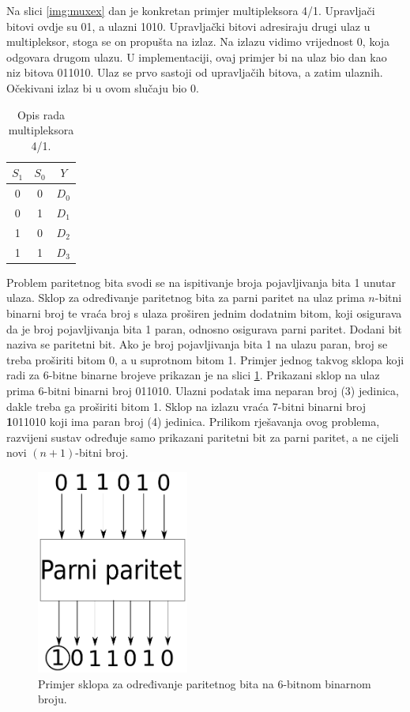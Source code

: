 \documentclass[times, utf8, zavrsni]{fer}
\begin{document}
Na slici \ref{img:muxex} dan je konkretan primjer multipleksora 4/1.
Upravljači bitovi ovdje su 01, a ulazni 1010.
Upravljački bitovi adresiraju drugi ulaz u multipleksor, stoga se on propušta na izlaz.
Na izlazu vidimo vrijednost 0, koja odgovara drugom ulazu.
U implementaciji, ovaj primjer bi na ulaz bio dan kao niz bitova 011010.
Ulaz se prvo sastoji od upravljačih bitova, a zatim ulaznih.
Očekivani izlaz bi u ovom slučaju bio 0.
\begin{table}[!htb]
    \caption{Opis rada multipleksora 4/1.}
    \label{tbl:mux}
    \centering
    \begin{tabular}{c | c | c}
        $S_{1}$ & $S_{0}$ & $Y$     \\ \hline
              0 &       0 & $D_{0}$ \\
              0 &       1 & $D_{1}$ \\
              1 &       0 & $D_{2}$ \\
              1 &       1 & $D_{3}$ \\
    \end{tabular}
\end{table}

Problem paritetnog bita svodi se na ispitivanje broja pojavljivanja bita 1 unutar ulaza.
Sklop za određivanje paritetnog bita za parni paritet na ulaz prima $n$-bitni binarni broj te vraća broj s ulaza proširen jednim dodatnim bitom, koji osigurava da je broj pojavljivanja bita 1 paran, odnosno osigurava parni paritet.
Dodani bit naziva se paritetni bit.
Ako je broj pojavljivanja bita 1 na ulazu paran, broj se treba proširiti bitom 0, a u suprotnom bitom 1.
Primjer jednog takvog sklopa koji radi za 6-bitne binarne brojeve prikazan je na slici \ref{img:parex}. Prikazani sklop na ulaz prima 6-bitni binarni broj 011010.
Ulazni podatak ima neparan broj (3) jedinica, dakle treba ga proširiti bitom 1.
Sklop na izlazu vraća 7-bitni binarni broj \textbf{1}011010 koji ima paran broj (4) jedinica.
Prilikom rješavanja ovog problema, razvijeni sustav određuje samo prikazani paritetni bit za parni paritet, a ne cijeli novi $(n + 1)$-bitni broj.
\begin{figure}[h]
    \centering
    \includegraphics[width=5cm]{img/parity.pdf}
    \caption{Primjer sklopa za određivanje paritetnog bita na 6-bitnom binarnom broju.}
    \label{img:parex}
\end{figure}
\end{document}

